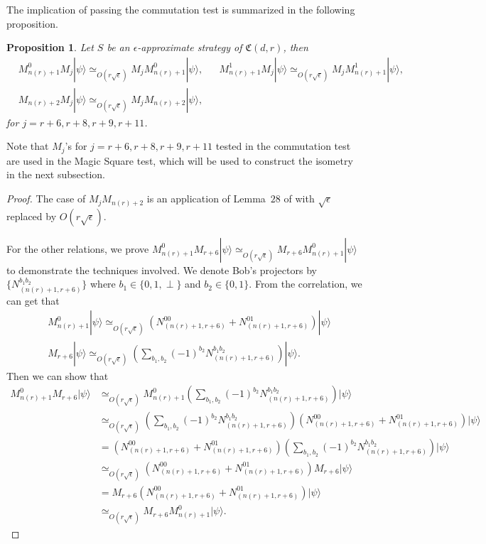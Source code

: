 \documentclass[11pt,letterpaper]{article}
\newcommand{\ket}[1]{|#1\rangle}
\newcommand{\1}{\mathbb{1}}
\newcommand{\nr}{n(r)}
\newcommand{\fC}{\mathfrak{C}}
\newcommand{\ep}{\epsilon}
\newcommand{\se}{\sqrt{\epsilon}}
\newcommand{\appd}[1]{\simeq_{#1}}
\newtheorem{proposition}[theorem]{Proposition}
\theoremstyle{definition}
\begin{document}
The implication of passing the commutation test is summarized in the following proposition.
\begin{proposition}
	\label{prop:rel_comm}
	Let $S$ be an $\ep$-approximate strategy of $\fC(d,r)$,
	then 
	\begin{align}
		&M_{\nr+1}^0 M_j \ket{\psi} \appd{O(r\se)} M_{j} M_{\nr+1}^0 \ket{\psi}, &&
		M_{\nr+1}^1 M_j \ket{\psi} \appd{O(r\se)} M_{j} M_{\nr+1}^1 \ket{\psi}, \\
		&M_{\nr+2} M_j \ket{\psi} \appd{O(r\se)} M_j M_{\nr+2} \ket{\psi},
	\end{align}
	for $j = r+6, r+8,r+9,r+11$.
\end{proposition}
Note that $M_j$'s for $j = r+6, r+8,r+9,r+11$ tested in the commutation test are used in the Magic Square test,
which will be used to construct the isometry in the next subsection.
\begin{proof}
	The case of $M_j M_{\nr+2}$ is an application of Lemma~$28$ of \cite{coladan2017verifier} with $\se$ replaced by $O(r\se)$.
	
	For the other relations, we prove $M_{\nr+1}^0M_{r+6} \ket{\psi} \appd{O(r\se)} M_{r+6}M_{\nr+1}^0 \ket{\psi}$ to demonstrate 
	the techniques involved. We denote Bob's projectors by $\{ N_{(\nr+1, r+6)}^{b_1 b_2} \}$ where $b_1 \in \{0, 1, \perp\}$ and
	$b_2 \in \{0,1\}$. From the correlation, we can get that 
	\begin{align*}
		&M_{\nr+1}^0 \ket{\psi} \appd{O(r\se)} (N_{(\nr+1, r+6)}^{00} + N_{(\nr+1, r+6)}^{01}) \ket{\psi} \\
		&M_{r+6} \ket{\psi} \appd{O(r\se)} (\sum_{b_1, b_2} (-1)^{b_2}N_{(\nr+1, r+6)}^{b_1b_2})\ket{\psi}.
	\end{align*}
	Then we can show that
	\begin{align*}
		M_{\nr+1}^0 M_{r+6} \ket{\psi} &\appd{O(r\se)} M_{\nr+1}^0 (\sum_{b_1, b_2} (-1)^{b_2}N_{(\nr+1, r+6)}^{b_1b_2})\ket{\psi}\\
		&\appd{O(r\se)}(\sum_{b_1, b_2} (-1)^{b_2}N_{(\nr+1, r+6)}^{b_1b_2}) (N_{(\nr+1, r+6)}^{00} + N_{(\nr+1, r+6)}^{01})
		\ket{\psi} \\
		&= (N_{(\nr+1, r+6)}^{00} + N_{(\nr+1, r+6)}^{01}) (\sum_{b_1, b_2} (-1)^{b_2}N_{(\nr+1, r+6)}^{b_1b_2})  \ket{\psi} \\
		& \appd{O(r\se)} (N_{(\nr+1, r+6)}^{00} + N_{(\nr+1, r+6)}^{01}) M_{r+6} \ket{\psi} \\
		&= M_{r+6}  (N_{(\nr+1, r+6)}^{00} + N_{(\nr+1, r+6)}^{01}) \ket{\psi} \\
		& \appd{O(r\se)} M_{r+6}M_{\nr+1}^0 \ket{\psi}.
	\end{align*}
\end{proof}
\end{document}
